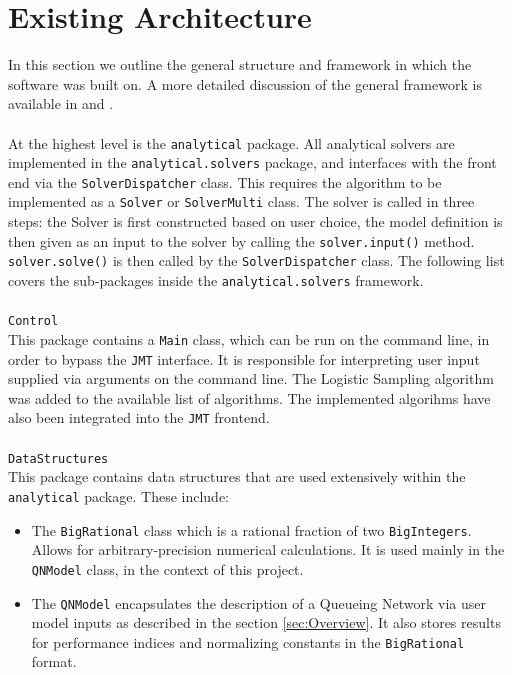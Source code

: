 \section{Existing Architecture}
In this section we outline the general structure and framework in which the software was built on. A more detailed discussion of the general framework is available in \cite{Chugh2012AlgorithmsAnalysis} and \cite{Makaronidis2010EfficientModels}. 
\\\\
At the highest level is the \texttt{analytical} package. All analytical solvers are implemented in the \texttt{analytical.solvers} package, and interfaces with the front end via the \texttt{SolverDispatcher} class. This requires the algorithm to be implemented as a \texttt{Solver} or \texttt{SolverMulti} class. The solver is called in three steps: the Solver is first constructed based on user choice, the model definition is then given as an input to the solver by calling the \texttt{solver.input()} method. \texttt{solver.solve()} is then called by the \texttt{SolverDispatcher} class. The following list covers the sub-packages inside the \texttt{analytical.solvers} framework.
\\\\
{\large \texttt{Control} }\\
This package contains a \texttt{Main} class, which can be run on the command line, in order to bypass the \texttt{JMT} interface. It is responsible for interpreting user input supplied via arguments on the command line. The Logistic Sampling algorithm was added to the available list of algorithms. The implemented algorihms have also been integrated into the \texttt{JMT} frontend.
\\\\
{\large \texttt{DataStructures} }\\
This package contains data structures that are used extensively within the \texttt{analytical} package. These include:
\begin{itemize}
    \item The \texttt{BigRational} class which is a rational fraction of two \texttt{BigIntegers}. Allows for arbitrary-precision numerical calculations. It is used mainly in the \texttt{QNModel} class, in the context of this project.
    \item The \texttt{QNModel} encapsulates the description of a Queueing Network via user model inputs as described in the section \ref{sec:Overview}. It also stores results for performance indices and normalizing constants in the \texttt{BigRational} format.
\end{itemize}

